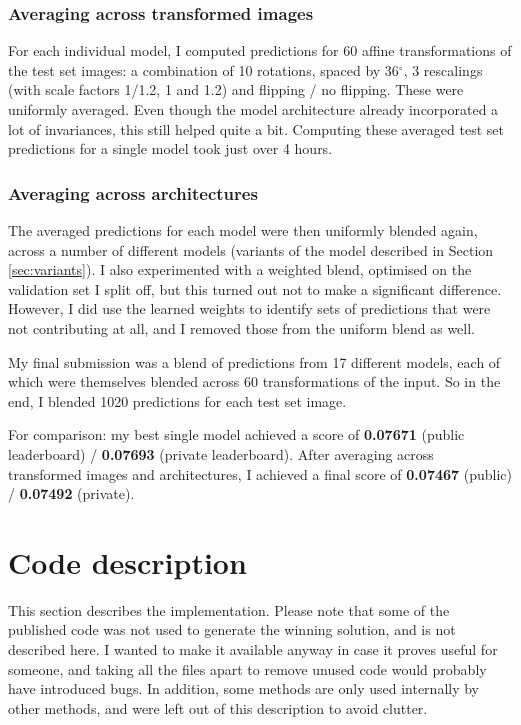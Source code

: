 \documentclass[a4paper,10pt]{article}
\begin{document}
\subsubsection{Averaging across transformed images}

For each individual model, I computed predictions for 60 affine transformations of the test set images: a combination of 10 rotations, spaced by 36$^\circ$, 3 rescalings (with scale factors 1/1.2, 1 and 1.2) and flipping / no flipping. These were uniformly averaged. Even though the model architecture already incorporated a lot of invariances, this still helped quite a bit. Computing these averaged test set predictions for a single model took just over 4 hours.

\subsubsection{Averaging across architectures}

The averaged predictions for each model were then uniformly blended again, across a number of different models (variants of the model described in Section \ref{sec:variants}). I also experimented with a weighted blend, optimised on the validation set I split off, but this turned out not to make a significant difference. However, I did use the learned weights to identify sets of predictions that were not contributing at all, and I removed those from the uniform blend as well.

My final submission was a blend of predictions from 17 different models, each of which were themselves blended across 60 transformations of the input. So in the end, I blended 1020 predictions for each test set image.

For comparison: my best single model achieved a score of \textbf{0.07671} (public leaderboard) / \textbf{0.07693} (private leaderboard). After averaging across transformed images and architectures, I achieved a final score of \textbf{0.07467} (public) / \textbf{0.07492} (private).


\section{Code description}

This section describes the implementation. Please note that some of the published code was not used to generate the winning solution, and is not described here. I wanted to make it available anyway in case it proves useful for someone, and taking all the files apart to remove unused code would probably have introduced bugs. In addition, some methods are only used internally by other methods, and were left out of this description to avoid clutter.
\end{document}
